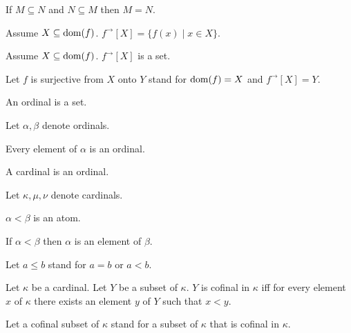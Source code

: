 \documentclass{article}
\newcommand{\image}[2]{#1^{\to}[#2]}
\begin{document}
\begin{forthel}
    \begin{axiom}[Extensionality]
      If $M\subseteq N$ and $N\subseteq M$ then $M = N$.
    \end{axiom}

    \begin{definition}
      Assume $X\subseteq \operatorname{dom}(f)$.
      $\image{f}{X} = \{f(x) \mid x \in X\}$.
    \end{definition}

    \begin{axiom}
      Assume $X\subseteq \operatorname{dom}(f)$.
      $\image{f}{X}$ is a set.
    \end{axiom}

    Let $f$ is surjective from $X$ onto $Y$ stand for $\operatorname{dom}(f) = X$ and $\image{f}{X} = Y$.

    \begin{signature}
      An ordinal is a set.
    \end{signature}

    Let $\alpha, \beta$ denote ordinals.

    \begin{axiom}
      Every element of $\alpha$ is an ordinal.
    \end{axiom}

    \begin{signature}
      A cardinal is an ordinal.
    \end{signature}

    Let $\kappa, \mu, \nu$ denote cardinals.

    \begin{signature}
      $\alpha < \beta$ is an atom.
    \end{signature}

    \begin{axiom}
      If $\alpha < \beta$ then $\alpha$ is an element of $\beta$.
    \end{axiom}

    Let $a \leq b$ stand for $a = b$ or $a < b$.

    \begin{definition}[Cofinality]
      Let $\kappa$ be a cardinal.
      Let $Y$ be a subset of $\kappa$.
      $Y$ is cofinal in $\kappa$ iff
        for every element $x$ of $\kappa$ there exists an element $y$ of $Y$ such that $x < y$.
    \end{definition}

    Let a cofinal subset of $\kappa$ stand for a subset of $\kappa$ that is cofinal in $\kappa$.


\end{forthel}
\end{document}
